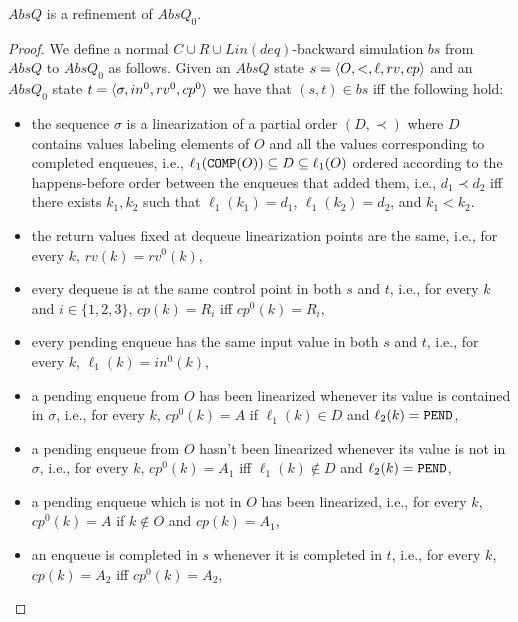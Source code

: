 %
\begin{lemma} 
$AbsQ$ is a refinement of $AbsQ_0$.
\end{lemma}
\begin{proof}
We define a normal $C\cup R\cup Lin(deq)$-backward simulation $bs$ from $AbsQ$ to $AbsQ_0$ as follows. Given an $AbsQ$ state $s=\langle {O,<,\ell,rv,cp} \rangle$ and an $AbsQ_0$ state $t=\langle {\sigma,in^0,rv^0,cp^0} \rangle$ we have that $(s,t)\in bs$ iff the following hold:
\begin{itemize}
	\item the sequence $\sigma$ is a linearization of a partial order $(D,\prec)$ where $D$ contains values labeling elements of $O$ and all the values corresponding to completed enqueues, i.e., $\ell_1({\tt COMP}(O))\subseteq D\subseteq \ell_1(O)$ ordered according to the happens-before order between the enqueues that added them, i.e., $d_1\prec d_2$ if{f} there exists $k_1,k_2$ such that $\ell_1(k_1)=d_1$, $\ell_1(k_2)=d_2$, and $k_1 < k_2$.
	\item the return values fixed at dequeue linearization points are the same, i.e., for every $k$, $rv(k)=rv^0(k)$,
	\item every dequeue is at the same control point in both $s$ and $t$, i.e., for every $k$ and $i\in \{1,2,3\}$, $cp(k)=R_i$ iff $cp^0(k)=R_i$,
	\item every pending enqueue has the same input value in both $s$ and $t$, i.e., for every $k$, $\ell_1(k)=in^0(k)$,
	\item a pending enqueue from $O$ has been linearized whenever its value is contained in $\sigma$, i.e., for every $k$, $cp^0(k)=A$ if $\ell_1(k)\in D$ and $\ell_2(k)={\tt PEND}$, 
	\item a pending enqueue from $O$ hasn't been linearized whenever its value is not in $\sigma$, i.e., for every $k$, $cp^0(k)=A_1$ iff $\ell_1(k)\not\in D$ and $\ell_2(k)={\tt PEND}$, 
	\item a pending enqueue which is not in $O$ has been linearized, i.e., for every $k$, $cp^0(k)=A$ if $k\not\in O$ and $cp(k)=A_1$, 
	\item an enqueue is completed in $s$ whenever it is completed in $t$, i.e., for every $k$, $cp(k)=A_2$ iff $cp^0(k)=A_2$,
\end{itemize}


\end{proof}
